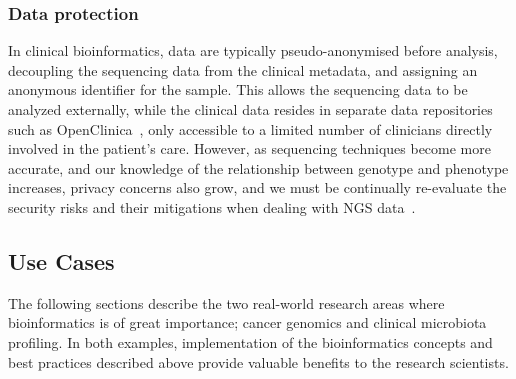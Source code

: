 \begin{justify}
\subsubsection{Data protection}
In clinical bioinformatics, data are typically pseudo-anonymised before analysis, decoupling the sequencing data from the clinical metadata, and assigning an anonymous identifier for the sample. This allows the sequencing data to be analyzed externally, while the clinical data resides in separate data repositories such as OpenClinica~\cite{cavelaars2015openclinica}, only accessible to a limited number of clinicians directly involved in the patient's care. However, as sequencing techniques become more accurate, and our knowledge of the relationship between genotype and phenotype increases, privacy concerns also grow, and we must be continually re-evaluate the security risks and their mitigations when dealing with NGS data~\cite{erlich2014routes}.

\subsection{Use Cases}
The following sections describe the two real-world research areas where bioinformatics is of great importance; cancer genomics and clinical microbiota profiling. In both examples, implementation of the bioinformatics concepts and best practices described above provide valuable benefits to the research scientists.




\end{justify}
